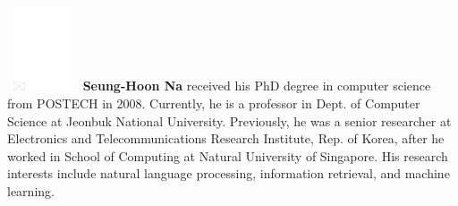 \documentclass[AMS,STIX2COL]{WileyNJD-v2}
\begin{document}
    \begin{biography}
    {\includegraphics[width=60pt,height=70pt,draft]{empty}}
    {\textbf{Seung-Hoon Na} received his PhD degree in computer science from POSTECH in 2008. Currently, he is a professor in Dept. of Computer Science at Jeonbuk National University. Previously, he was a senior researcher at Electronics and Telecommunications Research Institute, Rep. of Korea, after he worked in School of Computing at Natural University of Singapore. His research interests include natural language processing, information retrieval, and machine learning.}
    \end{biography}
\end{document}
